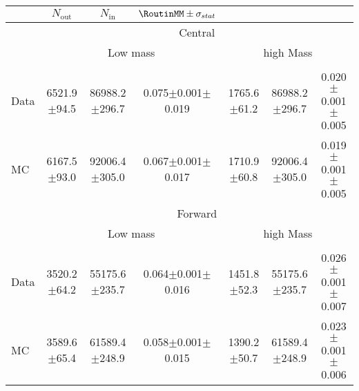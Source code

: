 \begin{table}[hbtp]
\begin{tabular}{l|c|c|cc|c|c}
 & $N_{\text{out}}$ & $N_{\text{in}}$ & $ \RoutinMM \pm \sigma_{stat}$  \\    
\hline
 & \multicolumn{6}{c}{Central} \\
 & \multicolumn{3}{c}{Low mass}  & \multicolumn{3}{c}{high Mass} \\ \\ 
\hline
 Data & 6521.9$\pm$94.5 & 86988.2$\pm$296.7 & 0.075$\pm$0.001$\pm$0.019 & 1765.6$\pm$61.2 & 86988.2$\pm$296.7 & 0.020$\pm$0.001$\pm$0.005 \\
 MC & 6167.5$\pm$93.0 & 92006.4$\pm$305.0 & 0.067$\pm$0.001$\pm$0.017 & 1710.9$\pm$60.8 & 92006.4$\pm$305.0 & 0.019$\pm$0.001$\pm$0.005 \\
 
 
    \hline 
& \multicolumn{6}{c}{Forward} \\
 & \multicolumn{3}{c}{Low mass}  & \multicolumn{3}{c}{high Mass} \\ \\ 
\hline
 Data & 3520.2$\pm$64.2 & 55175.6$\pm$235.7 & 0.064$\pm$0.001$\pm$0.016 & 1451.8$\pm$52.3 & 55175.6$\pm$235.7 & 0.026$\pm$0.001$\pm$0.007 \\
 MC & 3589.6$\pm$65.4 & 61589.4$\pm$248.9 & 0.058$\pm$0.001$\pm$0.015 & 1390.2$\pm$50.7 & 61589.4$\pm$248.9 & 0.023$\pm$0.001$\pm$0.006 \\

  
\end{tabular}  
\end{table}

